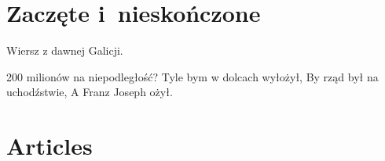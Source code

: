 \documentclass[a4paper,11pt]{article}
\begin{document}
\begin{enumerate}












































\end{enumerate}










\newpage
\section{Zaczęte i~nieskończone}

\vspace{\spaceTwo}



Wiersz z dawnej Galicji.

200 milionów na niepodległość? Tyle bym w dolcach wyłożył, By rząd był
na uchodźstwie, A Franz Joseph ożył.










\newpage
\section{Articles}

\vspace{\spaceTwo}
\end{document}
